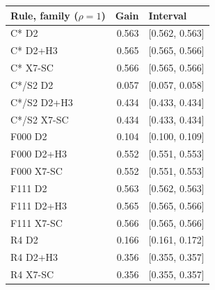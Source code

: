 \begin{tabular}{@{}lrl@{}}\toprule
Rule, family ($\rho = 1$) & Gain & Interval \\\midrule
C* D2 & 0.563 & [0.562, 0.563] \\
C* D2+H3 & 0.565 & [0.565, 0.566] \\
C* X7-SC & 0.566 & [0.565, 0.566] \\
C*/S2 D2 & 0.057 & [0.057, 0.058] \\
C*/S2 D2+H3 & 0.434 & [0.433, 0.434] \\
C*/S2 X7-SC & 0.434 & [0.433, 0.434] \\
F000 D2 & 0.104 & [0.100, 0.109] \\
F000 D2+H3 & 0.552 & [0.551, 0.553] \\
F000 X7-SC & 0.552 & [0.551, 0.553] \\
F111 D2 & 0.563 & [0.562, 0.563] \\
F111 D2+H3 & 0.565 & [0.565, 0.566] \\
F111 X7-SC & 0.566 & [0.565, 0.566] \\
R4 D2 & 0.166 & [0.161, 0.172] \\
R4 D2+H3 & 0.356 & [0.355, 0.357] \\
R4 X7-SC & 0.356 & [0.355, 0.357] \\
\bottomrule\end{tabular}
